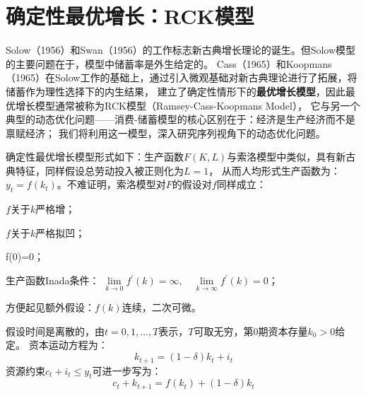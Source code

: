 
\section{确定性最优增长：RCK模型} \label{sec-opt-growth}

Solow（1956）和Swan（1956）的工作标志新古典增长理论的诞生。但Solow模型的主要问题在于，模型中储蓄率是外生给定的。
Cass（1965）和Koopmans（1965）在Solow工作的基础上，通过引入微观基础对新古典理论进行了拓展，将储蓄作为理性选择下的内生结果，
建立了确定性情形下的\textbf{最优增长模型}，因此最优增长模型通常被称为RCK模型（Ramsey-Cass-Koopmans Model），
它与另一个典型的动态优化问题——消费-储蓄模型的核心区别在于：经济是生产经济而不是禀赋经济；
我们将利用这一模型，深入研究序列视角下的动态优化问题。

确定性最优增长模型形式如下：生产函数$F(K,L)$与索洛模型中类似，具有新古典特征，同样假设总劳动投入被正则化为$L=1$，
从而人均形式生产函数为：$y_t=f(k_t)$。不难证明，索洛模型对$F$的假设对$f$同样成立：
\begin{assumption} \label{as-f}
    $f$关于$k$严格增；
\end{assumption}
\begin{assumption}
    $f$关于$k$严格拟凹；
\end{assumption}
\begin{assumption}
    f(0)=0；
\end{assumption}
\begin{assumption} \label{as-f-inada}
    生产函数Inada条件：
    $\lim\limits_{k \rightarrow 0} f^{\prime}(k)=\infty, \quad \lim\limits_{k \rightarrow \infty} f^{\prime}(k)=0$；
\end{assumption}
\begin{assumption}
    方便起见额外假设：$f\left(k\right)$连续，二次可微。
\end{assumption}
假设时间是离散的，由$t=0,1,\dots,T$表示，$T$可取无穷，第0期资本存量$k_0>0$给定。
资本运动方程为：
\begin{equation*}
    k_{t+1} = (1-\delta)k_t + i_t
\end{equation*}
资源约束$c_t+i_t\leq y_t$可进一步写为：
\begin{equation*}
    c_t+k_{t+1}=f\left(k_t\right)+(1-\delta)k_t
\end{equation*}


